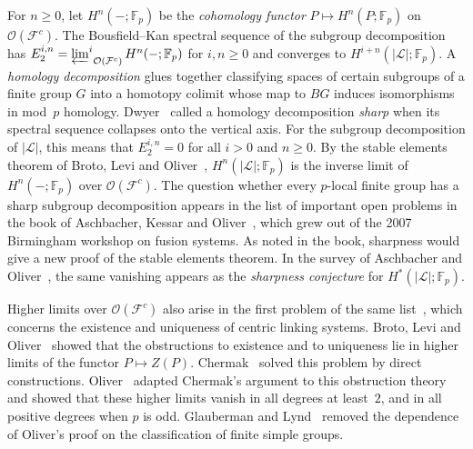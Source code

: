 \documentclass[10pt]{amsart}
\theoremstyle{definition}
\numberwithin{equation}{section}
\renewcommand{\ge}{\geqslant}
\newcommand{\F}{\mathcal F}
\newcommand{\Op}{\mathcal O}
\newcommand{\limi}[2]{\mathop{\varprojlim\nolimits^{#1}}_{#2}}
\begin{document}
For $n\ge0$, let $H^n(-;\mathbb{F}_p)$ be the \emph{cohomology functor} $P\mapsto H^n(P;\mathbb{F}_p)$ on $\Op(\F^c)$. The Bousfield\nobreakdash--Kan spectral sequence of the subgroup decomposition has $E_2^{i,n}=\limi{i}{\Op(\F^c)}H^n(-;\mathbb{F}_p)$ for $i,n\ge0$ and converges to $H^{i+n}(|\mathcal L|;\mathbb{F}_p)$. A \emph{homology decomposition} glues together classifying spaces of certain subgroups of a finite group $G$ into a homotopy colimit whose map to $BG$ induces isomorphisms in mod~$p$ homology. Dwyer~\cite[\S1]{Dwyer1998Sharp} called a homology decomposition \emph{sharp} when its spectral sequence collapses onto the vertical axis. For the subgroup decomposition of $|\mathcal L|$, this means that $E_2^{i,n}=0$ for all $i>0$ and $n\ge0$. By the stable elements theorem of Broto, Levi and Oliver~\cite[Theorem~5.8]{BLO}, $H^n(|\mathcal L|;\mathbb{F}_p)$ is the inverse limit of $H^n(-;\mathbb{F}_p)$ over $\Op(\F^c)$. The question whether every $p$-local finite group has a sharp subgroup decomposition appears in the list of important open problems in the book of Aschbacher, Kessar and Oliver~\cite[\S III.7]{AKO}, which grew out of the 2007 Birmingham workshop on fusion systems. As noted in the book, sharpness would give a new proof of the stable elements theorem. In the survey of Aschbacher and Oliver~\cite{AO}, the same vanishing appears as the \emph{sharpness conjecture} for $H^*(|\mathcal L|;\mathbb{F}_p)$.

Higher limits over $\Op(\F^c)$ also arise in the first problem of the same list~\cite[\S III.7, Problem~1]{AKO}, which concerns the existence and uniqueness of centric linking systems. Broto, Levi and Oliver~\cite[Proposition~3.1]{BLO} showed that the obstructions to existence and to uniqueness lie in higher limits of the functor $P\mapsto Z(P)$. Chermak~\cite{Chermak2013} solved this problem by direct constructions. Oliver~\cite{Oliver2013} adapted Chermak's argument to this obstruction theory and showed that these higher limits vanish in all degrees at least~$2$, and in all positive degrees when $p$ is odd. Glauberman and Lynd~\cite{GL2016} removed the dependence of Oliver's proof on the classification of finite simple groups.
\end{document}
